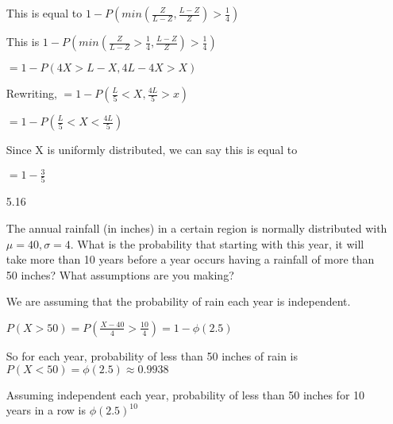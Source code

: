 \documentclass[11pt]{article}
\begin{document}
\begin{itemize}
   This is equal to $1 - P( min(\frac{Z}{L-Z}, \frac{L-Z}{Z}) > \frac{1}{4})$

   This is $1 - P( min(\frac{Z}{L-Z} > \frac{1}{4}, \frac{L-Z}{Z}) > \frac{1}{4})$

   $=1 - P(4X > L - X, 4L - 4X > X)$

   Rewriting, $= 1 - P(\frac{L}{5} < X, \frac{4L}{5} > x)$

   $= 1 - P(\frac{L}{5} < X < \frac{4L}{5})$

   Since X is uniformly distributed, we can say this is equal to

   $= 1 - \frac{3}{5}$

\item[5.16]

  The annual rainfall (in inches) in a certain region is normally distributed with $\mu = 40, \sigma = 4$. What is the probability that starting with this year, it will take more than 10 years before a year occurs having a rainfall of more than 50 inches? What assumptions are you making?

  We are assuming that the probability of rain each year is independent.

  $P(X > 50) = P(\frac{X-40}{4} > \frac{10}{4}) = 1- \phi(2.5)$

  So for each year, probability of less than 50 inches of rain is $P(X < 50) = \phi(2.5) \approx 0.9938$

  Assuming independent each year, probability of less than 50 inches for 10 years in a row is $\phi(2.5)^{10}$

\end{itemize}
\end{document}
